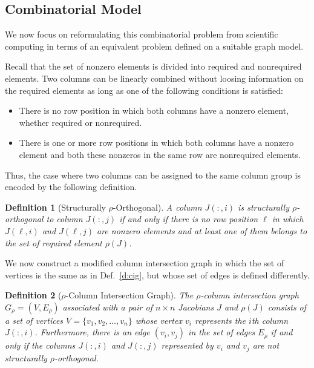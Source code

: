 \documentclass[12pt, oneside]{book}
\newtheorem{definition}{Definition}
\newcommand{\sparsifysymbol}{\ensuremath{\rho}}
\newcommand{\sparsify}[1]{\ensuremath{\sparsifysymbol(#1)}}
\begin{document}
\subsection{Combinatorial Model}
We now focus on reformulating this combinatorial problem from
scientific computing in terms of an equivalent problem defined on a suitable graph model.

Recall that the set of nonzero elements is divided into required and nonrequired
elements. Two columns can be linearly combined without loosing information on the
required elements as long as one of the following conditions is satisfied:
\begin{itemize}
  \item There is no row position in which both columns have a nonzero element, whether
      required or nonrequired.
  \item There is one or more row positions in which both columns have a nonzero element
      and both these nonzeros in the same row are nonrequired elements.
\end{itemize}

Thus, the case where two columns can be assigned to the same column group is encoded by
the following definition.

\begin{definition}[Structurally $\sparsifysymbol$-Orthogonal]
A column $J(:,i)$ is structurally $\sparsifysymbol$-orthogonal to column $J(:,j)$ if and
only if there is no row position $\ell$ in which $J(\ell,i)$ and $J(\ell,j)$ are nonzero
elements and at least one of them belongs to the set of required element \sparsify{J}.
\end{definition}

We now construct a modified column intersection graph in which the set of vertices is the
same as in Def.~\ref{d:cig}, but whose set of edges is defined differently.
%
\begin{definition}[$\sparsifysymbol$-Column Intersection Graph]
The $\sparsifysymbol$-column intersection graph $G_\sparsifysymbol =
(V,E_\sparsifysymbol)$ associated with a pair of $n \times n$ Jacobians $J$ and
\sparsify{J} consists of a set of vertices $V=\{v_1, v_2, \dots, v_n\}$ whose vertex
$v_i$ represents the $i$th column $J(:,i)$. Furthermore, there is an edge $(v_i,v_j)$ in
the set of edges $E_\sparsifysymbol$ if and only if the columns $J(:,i)$ and $J(:,j)$
represented by $v_i$ and $v_j$ are not structurally $\sparsifysymbol$-orthogonal.
\end{definition}
\end{document}
